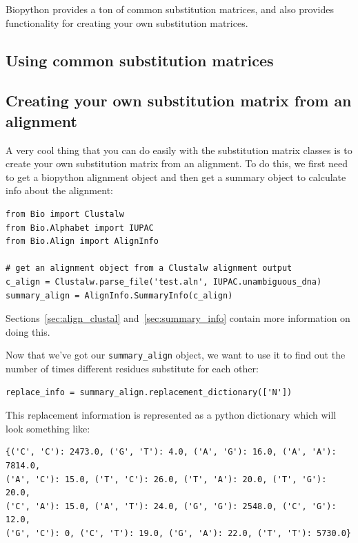 \documentclass{report}
\begin{document}
Biopython provides a ton of common substitution matrices, and also provides functionality for creating your own substitution matrices.

\subsection{Using common substitution matrices}

\subsection{Creating your own substitution matrix from an alignment}
\label{sec:subs_mat_ex}

A very cool thing that you can do easily with the substitution matrix classes is to create your own substitution matrix from an alignment. To do this, we first need to get a biopython alignment object and then get a summary object to calculate info about the alignment:

\begin{verbatim}
from Bio import Clustalw
from Bio.Alphabet import IUPAC
from Bio.Align import AlignInfo

# get an alignment object from a Clustalw alignment output
c_align = Clustalw.parse_file('test.aln', IUPAC.unambiguous_dna)
summary_align = AlignInfo.SummaryInfo(c_align)
\end{verbatim}

Sections~\ref{sec:align_clustal} and~\ref{sec:summary_info} contain more information on doing this.


Now that we've got our \verb|summary_align| object, we want to use it to find out the number of times different residues substitute for each other:

\begin{verbatim}
replace_info = summary_align.replacement_dictionary(['N'])
\end{verbatim}

This replacement information is represented as a python dictionary which will look something like:

\begin{verbatim}
{('C', 'C'): 2473.0, ('G', 'T'): 4.0, ('A', 'G'): 16.0, ('A', 'A'): 7814.0, 
('A', 'C'): 15.0, ('T', 'C'): 26.0, ('T', 'A'): 20.0, ('T', 'G'): 20.0, 
('C', 'A'): 15.0, ('A', 'T'): 24.0, ('G', 'G'): 2548.0, ('C', 'G'): 12.0, 
('G', 'C'): 0, ('C', 'T'): 19.0, ('G', 'A'): 22.0, ('T', 'T'): 5730.0}
\end{verbatim}
\end{document}
